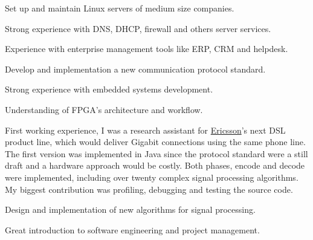 \documentclass[]{joaosoares-resume}
\begin{document}
\begin{minipage}[t]{0.64\textwidth}

\begin{tightemize}
\item Set up and maintain Linux servers of medium size companies.
\item Strong experience with DNS, DHCP, firewall and others server services.
\item Experience with enterprise management tools like ERP, CRM and helpdesk.
\end{tightemize}
\sectionsep

\begin{tightemize}
\item Develop and implementation a new communication protocol standard.
\item Strong experience with embedded systems development.
\item Understanding of FPGA's architecture and workflow.
\end{tightemize}
\sectionsep

\sectionsep
First working experience, I was a research assistant for
\href{https://www.ericsson.com/}{Ericsson}'s next DSL product line, which would
deliver Gigabit connections using the same phone line. The first version was
implemented in Java since the protocol standard were a still draft and a
hardware approach would be costly. Both phases, encode and decode were
implemented, including over twenty complex signal processing algorithms. My
biggest contribution was profiling, debugging and testing the source code.
\sectionsep
\begin{tightemize}
    \item Design and implementation of new algorithms for signal processing.
    \item Great introduction to software engineering and project management.
\end{tightemize}
\sectionsep


\end{minipage}
\end{document}
